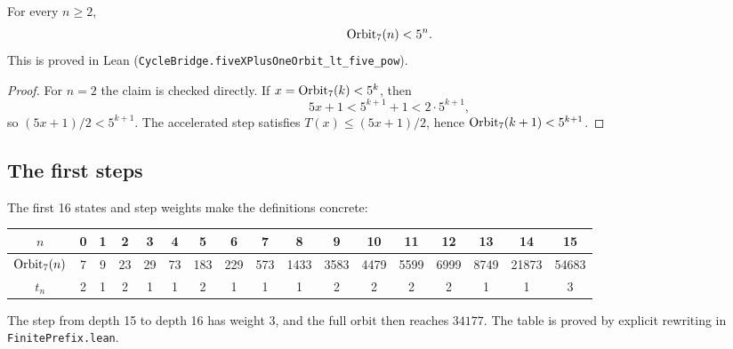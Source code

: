 \begin{proposition}\label{prop:orbit-bound}
For every $n\ge2$,
\begin{equation*}
  \mathrm{Orbit}_7(n)<5^n.
\end{equation*}
This is proved in Lean
(\texttt{CycleBridge.fiveXPlusOneOrbit\_lt\_five\_pow}).
\end{proposition}

\begin{proof}
For $n=2$ the claim is checked directly.  If
$x=\mathrm{Orbit}_7(k)<5^k$, then
\begin{equation*}
  5x+1<5^{k+1}+1<2\cdot5^{k+1},
\end{equation*}
so $(5x+1)/2<5^{k+1}$.  The accelerated step satisfies
$T(x)\le(5x+1)/2$, hence $\mathrm{Orbit}_7(k+1)<5^{k+1}$.
\end{proof}

\subsection{The first steps}

The first 16 states and step weights make the definitions concrete:
\begin{center}
\scriptsize
\begin{tabular}{@{}ccccccccccccccccc@{}}
\toprule
$n$ & 0 & 1 & 2 & 3 & 4 & 5 & 6 & 7 & 8 & 9 & 10 & 11 & 12 & 13 & 14 & 15 \\
\midrule
$\mathrm{Orbit}_7(n)$ & 7 & 9 & 23 & 29 & 73 & 183 & 229 & 573 & 1433 & 3583 & 4479 & 5599 & 6999 & 8749 & 21873 & 54683 \\
$t_n$ & 2 & 1 & 2 & 1 & 1 & 2 & 1 & 1 & 1 & 2 & 2 & 2 & 2 & 1 & 1 & 3 \\
\bottomrule
\end{tabular}
\end{center}
The step from depth 15 to depth 16 has weight $3$, and the full orbit
then reaches $34177$.  The table is proved by explicit rewriting in
\texttt{FinitePrefix.lean}.


